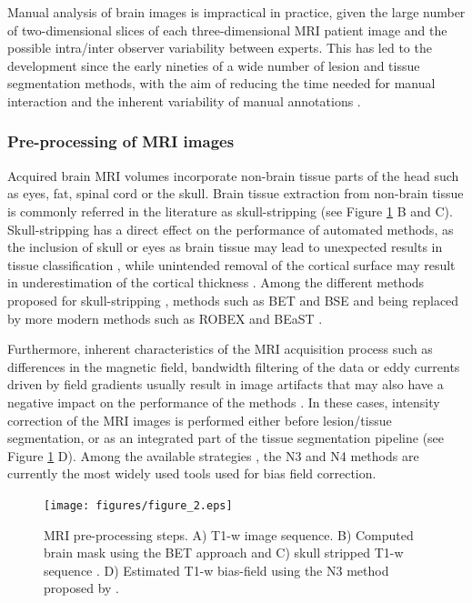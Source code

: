 Manual analysis of brain images is impractical in practice, given the large number of two-dimensional slices of each three-dimensional MRI patient image and the possible intra/inter observer variability between experts. This has led to the development since the early nineties of a wide number of lesion and tissue segmentation methods, with the aim of reducing the time needed for  manual interaction and the inherent variability of manual annotations \cite{Cline1990, Gerig1992, Kapur1996}.


\subsubsection{Pre-processing of MRI images}
Acquired brain MRI volumes incorporate non-brain tissue parts of the head such as eyes, fat, spinal cord or the skull. Brain tissue extraction from non-brain tissue is commonly referred in the literature as skull-stripping (see Figure \ref{preprocessing_mri} B and C). Skull-stripping has a direct effect on the performance of automated methods, as the inclusion of skull or eyes as brain tissue may lead to unexpected results in tissue classification \cite{Acosta-Cabronero2008, Popescu2012}, while unintended removal of the cortical surface may result in underestimation of the cortical thickness \cite{Sadananthan2010}. Among the different methods proposed for skull-stripping \cite{Acosta-Cabronero2008, Lee2003, Roura2014}, methods such as BET \cite{Smith2002} and BSE \cite{Shattuck2001} and being replaced by more modern methods such as ROBEX \cite{Iglesias2011} and BEaST \cite{Eskildsen2012}.

Furthermore, inherent characteristics of the MRI acquisition process such as differences in the magnetic field, bandwidth filtering of the data or eddy currents driven by field gradients usually result in image artifacts that may also have a negative impact on the performance of the methods \cite{Simmons1994}. In these cases, intensity correction of the MRI images is performed either before lesion/tissue segmentation, or as an integrated part of the tissue segmentation pipeline  (see Figure \ref{preprocessing_mri} D). Among the available strategies \cite{Arnold2001,Hou2006}, the N3 \cite{Sled1998} and N4 \cite{Tustison2010} methods are currently the most widely used tools used for bias field correction. 


\begin{figure}[top]
  \begin{center}
    \texttt{[image: figures/figure\_2.eps]}
  \end{center}
    \caption[MRI pre-processing steps]{MRI pre-processing steps. A) T1-w image sequence. B) Computed brain mask using the BET approach \cite{Smith2002} and C) skull stripped T1-w sequence  . D) Estimated T1-w bias-field using the N3 method proposed by \cite{Sled1998}.}
    \label{preprocessing_mri}
\end{figure}

